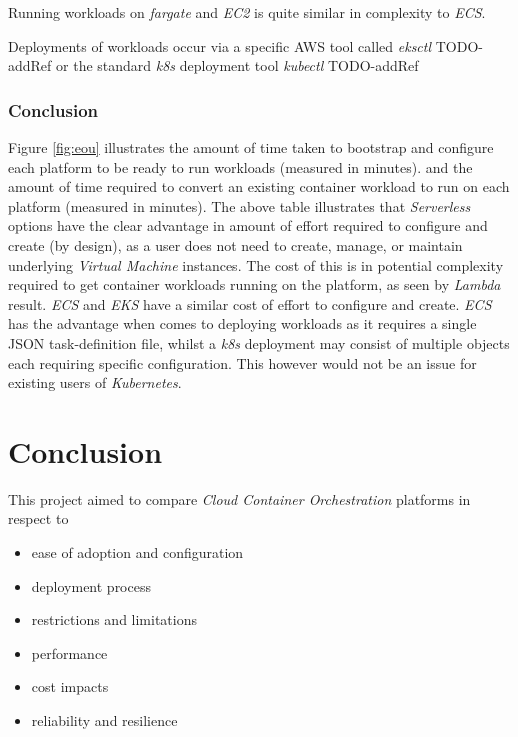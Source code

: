 Running workloads on \textit{fargate} and \textit{EC2} is quite similar in complexity to \textit{ECS}.

Deployments of workloads occur via a specific AWS tool called \emph{eksctl} TODO-addRef or the standard \textit{k8s} deployment tool \emph{kubectl} TODO-addRef

\subsection*{Conclusion}
Figure \ref{fig:eou} illustrates the amount of time taken to bootstrap and configure each platform to be ready to run workloads (measured in minutes).
and the amount of time required to convert an existing container workload to run on each platform (measured in minutes).
The above table illustrates that \textit{Serverless} options have the clear advantage in amount of effort required to configure and create (by design), as a user does not need to
create, manage, or maintain underlying \textit{Virtual Machine} instances. The cost of this is in potential complexity required to get container workloads running on the
platform, as seen by \textit{Lambda} result.
\textit{ECS} and \textit{EKS} have a similar cost of effort to configure and create. \textit{ECS} has the advantage when comes to deploying workloads as it requires a
single JSON task-definition file, whilst a \textit{k8s} deployment may consist of multiple objects each requiring specific configuration.
This however would not be an issue for existing users of \textit{Kubernetes}.

\chapter{Conclusion}

This project aimed to compare \emph{Cloud Container Orchestration} platforms in respect to
\begin{itemize}
      \item ease of adoption and configuration
      \item deployment process
      \item restrictions and limitations
      \item performance
      \item cost impacts
      \item reliability and resilience
\end{itemize}

